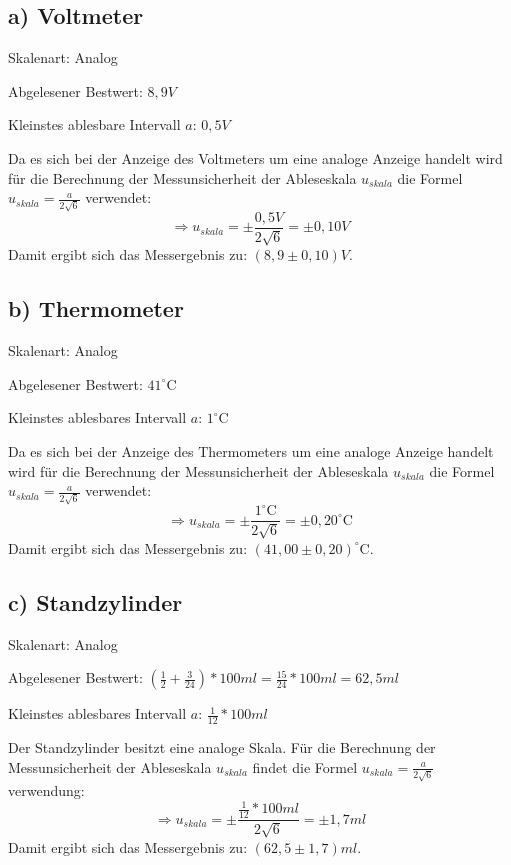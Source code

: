 \documentclass[
]{article}
\begin{document}
\hypertarget{a-voltmeter}{%
\subsection{a) Voltmeter}\label{a-voltmeter}}

Skalenart: Analog

Abgelesener Bestwert: \(8,9 V\)

Kleinstes ablesbare Intervall \(a\): \(0,5V\)

Da es sich bei der Anzeige des Voltmeters um eine analoge Anzeige
handelt wird für die Berechnung der Messunsicherheit der Ableseskala
\(u_{skala}\) die Formel \(u_{skala}=\frac{a}{2\sqrt{6}}\) verwendet:
\[\Rightarrow u_{skala} = \pm\frac{0,5V}{2\sqrt{6}} = \pm 0,10V\] Damit
ergibt sich das Messergebnis zu: \((8,9\pm0,10)V\).

\hypertarget{b-thermometer}{%
\subsection{b) Thermometer}\label{b-thermometer}}

Skalenart: Analog

Abgelesener Bestwert: \(41^\circ\text{C}\)

Kleinstes ablesbares Intervall \(a\): \(1^\circ\text{C}\)

Da es sich bei der Anzeige des Thermometers um eine analoge Anzeige
handelt wird für die Berechnung der Messunsicherheit der Ableseskala
\(u_{skala}\) die Formel \(u_{skala}=\frac{a}{2\sqrt{6}}\) verwendet:
\[\Rightarrow u_{skala} = \pm\frac{1^\circ\text{C}}{2\sqrt{6}} = \pm 0,20^\circ\text{C}\]
Damit ergibt sich das Messergebnis zu: \((41,00\pm0,20)^\circ\text{C}\).

\hypertarget{c-standzylinder}{%
\subsection{c) Standzylinder}\label{c-standzylinder}}

Skalenart: Analog

Abgelesener Bestwert:
\((\frac{1}{2}+\frac{3}{24})*100ml = \frac{15}{24}*100ml= 62,5ml\)

Kleinstes ablesbares Intervall \(a\): \(\frac{1}{12}*100ml\)

Der Standzylinder besitzt eine analoge Skala. Für die Berechnung der
Messunsicherheit der Ableseskala \(u_{skala}\) findet die Formel
\(u_{skala}=\frac{a}{2\sqrt{6}}\) verwendung:
\[\Rightarrow u_{skala} = \pm\frac{\frac{1}{12}*100ml}{2\sqrt{6}} = \pm 1,7ml\]
Damit ergibt sich das Messergebnis zu: \((62,5\pm1,7)ml\).
\end{document}
